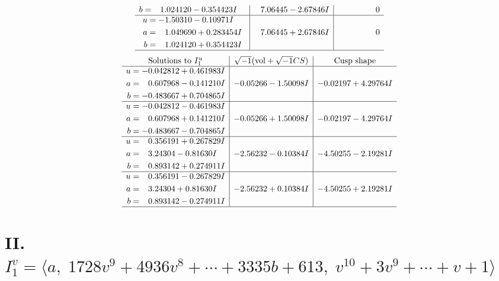 \documentclass[1p]{elsarticle_modified}
\theoremstyle{definition}
\newcommand{\I}{\sqrt{-1}}
\begin{document}
$$\begin{array}{c|c|c}
\begin{aligned}
b &= \phantom{-}1.024120 - 0.354423 I\end{aligned}
 & \phantom{-}7.06445 - 2.67846 I & \phantom{-0.000000 } 0 \\ \hline\begin{aligned}
u &= -1.50310 - 0.10971 I \\
a &= \phantom{-}1.049690 + 0.283454 I \\
b &= \phantom{-}1.024120 + 0.354423 I\end{aligned}
 & \phantom{-}7.06445 + 2.67846 I & \phantom{-0.000000 } 0\\
 \hline 
 \end{array}$$\newpage$$\begin{array}{c|c|c}  
\text{Solutions to }I^u_{1}& \I (\text{vol} + \sqrt{-1}CS) & \text{Cusp shape}\\
 \hline 
\begin{aligned}
u &= -0.042812 + 0.461983 I \\
a &= \phantom{-}0.607968 - 0.141210 I \\
b &= -0.483667 + 0.704865 I\end{aligned}
 & -0.05266 - 1.50098 I & -0.02197 + 4.29764 I \\ \hline\begin{aligned}
u &= -0.042812 - 0.461983 I \\
a &= \phantom{-}0.607968 + 0.141210 I \\
b &= -0.483667 - 0.704865 I\end{aligned}
 & -0.05266 + 1.50098 I & -0.02197 - 4.29764 I \\ \hline\begin{aligned}
u &= \phantom{-}0.356191 + 0.267829 I \\
a &= \phantom{-}3.24304 - 0.81630 I \\
b &= \phantom{-}0.893142 + 0.274911 I\end{aligned}
 & -2.56232 - 0.10384 I & -4.50255 - 2.19281 I \\ \hline\begin{aligned}
u &= \phantom{-}0.356191 - 0.267829 I \\
a &= \phantom{-}3.24304 + 0.81630 I \\
b &= \phantom{-}0.893142 - 0.274911 I\end{aligned}
 & -2.56232 + 0.10384 I & -4.50255 + 2.19281 I\\
 \hline 
 \end{array}$$\newpage\newpage\renewcommand{\arraystretch}{1}
\centering \section*{II. $I^v_{1}= \langle a,\;1728 v^9+4936 v^8+\cdots+3335 b+613,\;v^{10}+3 v^9+\cdots+v+1 \rangle$}
\end{document}
